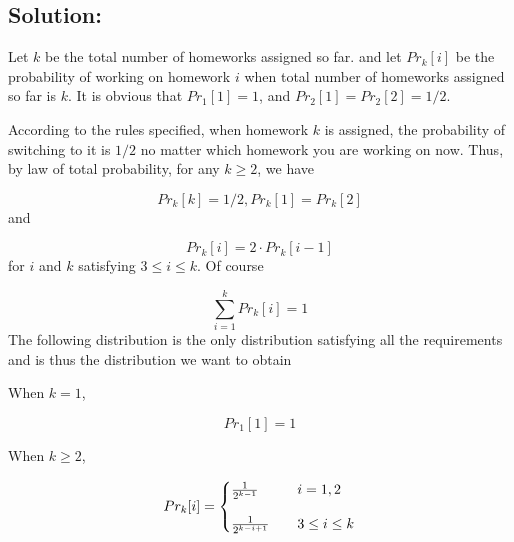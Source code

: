 \documentclass[10pt]{537homework}
\begin{document}
\subsection{Solution:}  

Let $k$ be the total number of homeworks assigned so far. and let $Pr_k[i]$  be the probability of working on homework $i$ when total number of homeworks assigned so far is $k$. It is obvious that $Pr_1[1] = 1$, and $Pr_2[1] = Pr_2[2] = 1/2$. 

According to the rules specified, when homework $k$ is assigned, the probability of switching to it is $1/2$ no matter which homework you are working on now. Thus, by law of total probability, for any $k \geq 2$, we have 

$$Pr_k[k]=1/2, Pr_k[1] = Pr_k[2]$$ and 

$$Pr_k[i] = 2\cdot Pr_k[i-1]$$ for $i$ and $k$ satisfying $ 3 \leq i \leq k $. Of course

$$\sum_{i=1}^k Pr_k[i] = 1$$ The following distribution is the only distribution satisfying all the requirements and is thus the distribution we want to obtain

When $k=1$, 

$$Pr_1[1] = 1$$

When $k\geq2$,

\[
Pr_k[i] = 
		\begin{cases}
            {1 \over 2^{k-1}} & \quad i=1, 2 \\[1em]   %
            {1 \over 2^{k-i+1}} & \quad 3 \leq i \leq k
        \end{cases}
\]
\end{document}
